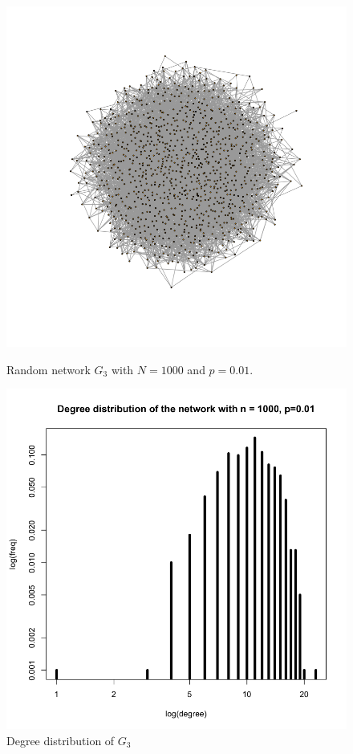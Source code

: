 \documentclass[draftcls,12pt,onecolumn]{IEEEtran}
\begin{document}
\begin{figure}[H]
\centering
\begin{minipage}[t]{0.48\textwidth}
\centering
\includegraphics[scale=0.2]{figures_part1_1/output_5_0.png}
\caption{Random network $G_3$ with $N=1000$ and $p=0.01$.}
\label{fig1}
\end{minipage}
\begin{minipage}[t]{0.48\textwidth}
\centering
\includegraphics[scale=0.2]{figures_part1_1/output_10_1.png}
\caption{Degree distribution of $G_3$}
\label{fig2}
\end{minipage}
\end{figure}
\end{document}
